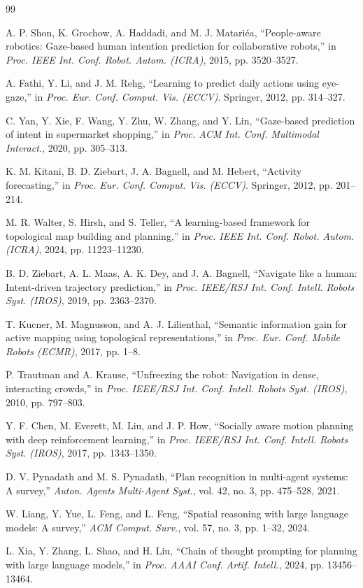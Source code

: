 \documentclass{letterpaper,article}
\begin{document}
\begin{thebibliography}{99}

A. P. Shon, K. Grochow, A. Haddadi, and M. J. Matari{\'{e}}a, ``People-aware robotics: Gaze-based human intention prediction for collaborative robots,'' in \textit{Proc. IEEE Int. Conf. Robot. Autom. (ICRA)}, 2015, pp. 3520--3527.

A. Fathi, Y. Li, and J. M. Rehg, ``Learning to predict daily actions using eye-gaze,'' in \textit{Proc. Eur. Conf. Comput. Vis. (ECCV)}. Springer, 2012, pp. 314--327.

C. Yan, Y. Xie, F. Wang, Y. Zhu, W. Zhang, and Y. Lin, ``Gaze-based prediction of intent in supermarket shopping,'' in \textit{Proc. ACM Int. Conf. Multimodal Interact.}, 2020, pp. 305--313.

K. M. Kitani, B. D. Ziebart, J. A. Bagnell, and M. Hebert, ``Activity forecasting,'' in \textit{Proc. Eur. Conf. Comput. Vis. (ECCV)}. Springer, 2012, pp. 201--214.

M. R. Walter, S. Hirsh, and S. Teller, ``A learning-based framework for topological map building and planning,'' in \textit{Proc. IEEE Int. Conf. Robot. Autom. (ICRA)}, 2024, pp. 11223--11230.

B. D. Ziebart, A. L. Maas, A. K. Dey, and J. A. Bagnell, ``Navigate like a human: Intent-driven trajectory prediction,'' in \textit{Proc. IEEE/RSJ Int. Conf. Intell. Robots Syst. (IROS)}, 2019, pp. 2363--2370.

T. Kucner, M. Magnusson, and A. J. Lilienthal, ``Semantic information gain for active mapping using topological representations,'' in \textit{Proc. Eur. Conf. Mobile Robots (ECMR)}, 2017, pp. 1--8.

P. Trautman and A. Krause, ``Unfreezing the robot: Navigation in dense, interacting crowds,'' in \textit{Proc. IEEE/RSJ Int. Conf. Intell. Robots Syst. (IROS)}, 2010, pp. 797--803.

Y. F. Chen, M. Everett, M. Liu, and J. P. How, ``Socially aware motion planning with deep reinforcement learning,'' in \textit{Proc. IEEE/RSJ Int. Conf. Intell. Robots Syst. (IROS)}, 2017, pp. 1343--1350.

D. V. Pynadath and M. S. Pynadath, ``Plan recognition in multi-agent systems: A survey,'' \textit{Auton. Agents Multi-Agent Syst.}, vol. 42, no. 3, pp. 475--528, 2021.

W. Liang, Y. Yue, L. Feng, and L. Feng, ``Spatial reasoning with large language models: A survey,'' \textit{ACM Comput. Surv.}, vol. 57, no. 3, pp. 1--32, 2024.

L. Xia, Y. Zhang, L. Shao, and H. Liu, ``Chain of thought prompting for planning with large language models,'' in \textit{Proc. AAAI Conf. Artif. Intell.}, 2024, pp. 13456--13464.

\end{thebibliography}
\end{document}
